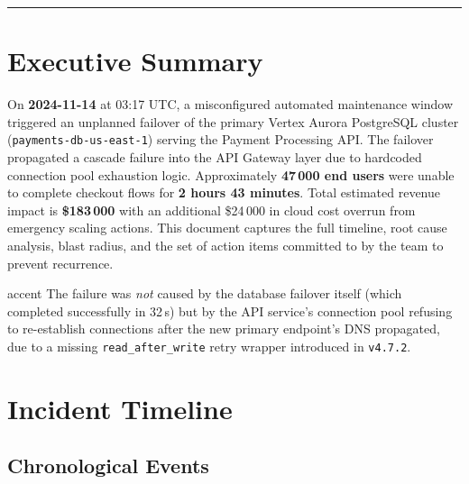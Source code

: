 \documentclass[11pt,a4paper]{article}
\begin{document}
\vspace{4pt}\textcolor{rule}{\rule{\linewidth}{0.5pt}}\vspace{2pt}

\section{Executive Summary}

On \textbf{2024-11-14} at 03:17 UTC, a misconfigured automated maintenance window
triggered an unplanned failover of the primary Vertex Aurora PostgreSQL cluster
(\texttt{payments-db-us-east-1}) serving the Payment Processing API. The failover
propagated a cascade failure into the API Gateway layer due to hardcoded connection
pool exhaustion logic. Approximately \textbf{47\,000 end users} were unable to
complete checkout flows for \textbf{2 hours 43 minutes}. Total estimated revenue
impact is \textbf{\$183\,000} with an additional \$24\,000 in cloud cost overrun
from emergency scaling actions. This document captures the full timeline, root
cause analysis, blast radius, and the set of action items committed to by the
team to prevent recurrence.

\begin{callout}[title={\faIcon{lightbulb}\hspace{4pt}Key Finding}]{accent}
The failure was \emph{not} caused by the database failover itself (which completed
successfully in 32\,s) but by the API service's connection pool refusing to
re-establish connections after the new primary endpoint's DNS propagated, due to a
missing \texttt{read\_after\_write} retry wrapper introduced in \texttt{v4.7.2}.
\end{callout}

\section{Incident Timeline}

\subsection{Chronological Events}
\end{document}
